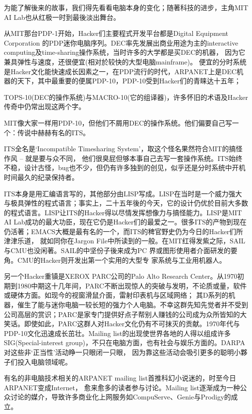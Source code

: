 \documentclass[a4paper,12pt,UTF8,twoside]{ctexbook}
\begin{document}
为能了解後来的故事，我们得先看看电脑本身的变化；随著科技的进步，主角MIT AI Lab也从红极一时到最後淡出舞台。

从MIT那台PDP-1开始，Hacker们主要程式开发平台都是Digital Equipment Corporation 的PDP迷你电脑序列。DEC率先发展出商业用途为主的interactive computing及time-sharing操作系统，当时许多的大学都是买DEC的机器， 因为它兼具弹性与速度，还很便宜(相对於较快的大型电脑mainframe)。 便宜的分时系统是Hacker文化能快速成长因素之一，在PDP流行的时代，ARPANET上是DEC机器的天下，其中最重要的便属PDP-10，PDP-10受到Hacker们的青睐达十五年；

TOPS-10(DEC的操作系统)与MACRO-10(它的组译器)，许多怀旧的术语及Hacker传奇中仍常出现这两个字。

MIT像大家一样用PDP-10，但他们不屑用DEC的操作系统。他们偏要自己写一个：传说中赫赫有名的ITS。

ITS全名是`Incompatible Timesharing System'，取这个怪名果然符合MIT的搞怪作风 -- 就是要与众不同， 他们很臭屁但够本事自己去写一套操作系统。ITS始终不稳，设计古怪，bug也不少，但仍有许多独到的创见，似乎还是分时系统中开机时间最久的纪录保持者。

ITS本身是用汇编语言写的，其他部分由LISP写成。LISP在当时是一个威力强大与极具弹性的程式语言；事实上，二十五年後的今天，它的设计仍优於目前大多数的程式语言。LISP让ITS的Hacker得以尽情发挥想像力与搞怪能力。LISP是MIT AI Lab成功的最大功臣，现在它仍是Hacker们的最爱之一。很多ITS的产物到现在仍活著；EMACS大概是最有名的一个，而ITS的稗官野史仍为今日的Hacker们所津津乐道， 就如同你在Jargon File中所读到的一般。在MIT红得发紫之际，SAIL与CMU也没闲著。SAIL的中坚份子後来成为PC 界或图形使用者介面研发的要角。CMU的Hacker则开发出第一个实用的大型专 家系统与工业用机器人。

另一个Hacker重镇是XEROX PARC公司的Palo Alto Research Center。从1970初期到1980中期这十几年间，PARC不断出现惊人的突破与发明，不论质或量，软件或硬体方面。如现今的视窗滑鼠介面，雷射印表机与区域网络； 其D系列的机器，催生了能与迷你电脑一较长短的强力个人电脑。不幸这群先知先觉者并不受到公司高层的赏识；PARC是家专门提供好点子帮别人赚钱的公司成为众所皆知的大笑话。即使如此，PARC这群人对Hacker文化仍有不可抹灭的贡献。1970年代与PDP-10文化迅速成长茁壮。Mailing list的出现使世界各地的人得以组成许多SIG(Special-interest group)，不只在电脑方面，也有社会与娱乐方面的。DARPA对这些非`正当性'活动睁一只眼闭一只眼， 因为靠这些活动会吸引更多的聪明小夥子们投入电脑领域呢。

有名的非电脑技术相关的ARPANET mailing list首推科幻小说迷的，时至今日ARPANET变成Internet， 愈来愈多的读者参与讨论。Mailing list逐渐成为一种公众讨论的媒介，导致许多商业化上网服务如CompuServe、Genie与Prodigy的成立。
\end{document}
